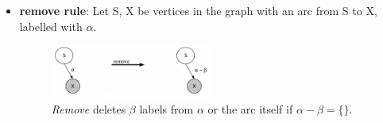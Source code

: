 \begin{itemize}
\item \textbf{remove rule}: Let S, X be vertices in the graph with an arc from S to X, labelled with $\alpha$. 
\begin{figure}[H]
\centering
	\includegraphics[width=0.5\textwidth]{./Pictures/removeRule.png}
	\caption[remove rule]{\textit{Remove} deletes $\beta$ labels from $\alpha$ or the arc itself if $\alpha - \beta = \lbrace\rbrace$. \cite{TakeG}}
	\label{fig:clremove}
\end{figure}		
\end{itemize}	
	
